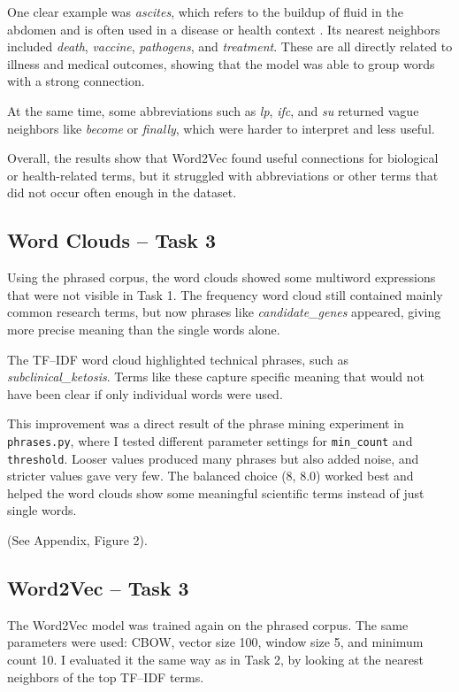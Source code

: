 \documentclass[11pt]{article}
\begin{document}
One clear example was \textit{ascites}, which refers to the buildup of fluid in the abdomen and is often 
used in a disease or health context \citep{clevelandclinic2025ascites}. Its nearest neighbors included 
\textit{death}, \textit{vaccine}, \textit{pathogens}, and \textit{treatment}. These are all directly related 
to illness and medical outcomes, showing that the model was able to group words with a strong connection.  

At the same time, some abbreviations such as 
\textit{lp}, \textit{ifc}, and \textit{su} returned vague neighbors like \textit{become} or \textit{finally}, 
which were harder to interpret and less useful.  

Overall, the results show that Word2Vec found useful connections for biological or health-related 
terms, but it struggled with abbreviations or other terms that did not occur often enough in the dataset.

\subsection{Word Clouds -- Task 3}
Using the phrased corpus, the word clouds showed some multiword expressions that were not visible in Task 1. 
The frequency word cloud still contained mainly common research terms, but now phrases like 
\textit{candidate\_genes} appeared, giving more precise meaning than the single words alone.  

The TF--IDF word cloud highlighted technical phrases, such as \textit{subclinical\_ketosis}. 
Terms like these capture specific meaning that would not have been clear if only individual words were used.  

This improvement was a direct result of the phrase mining experiment in \texttt{phrases.py}, where I tested 
different parameter settings for \texttt{min\_count} and \texttt{threshold}. Looser values produced many 
phrases but also added noise, and stricter values gave very few. The balanced choice (8, 8.0) worked best 
and helped the word clouds show some meaningful scientific terms instead of just single words.  

(See Appendix, Figure 2).  

\subsection{Word2Vec -- Task 3}
The Word2Vec model was trained again on the phrased corpus. The same parameters were used: 
CBOW, vector size 100, window size 5, and minimum count 10. I evaluated it the same way as 
in Task 2, by looking at the nearest neighbors of the top TF--IDF terms.  
\end{document}
